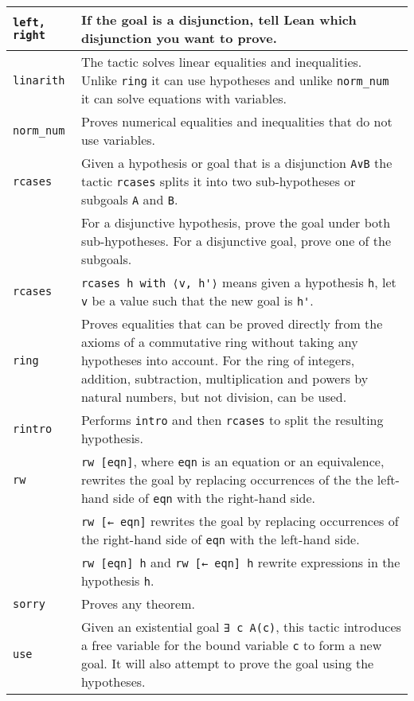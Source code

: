 \begin{tabular}{p{}|@{\hspace{1em}}p{}}
\Verb+left, right+ & If the goal is a disjunction, tell Lean which disjunction you want to prove.\\\hline

\Verb+linarith+&The tactic solves linear equalities and inequalities. Unlike \Verb+ring+ it can use hypotheses and unlike \Verb+norm_num+ it can solve equations with variables.\\\hline

\Verb+norm_num+&Proves numerical equalities and inequalities that do not use variables.\\\hline

\Verb+rcases+&Given a hypothesis or goal that is a disjunction \Verb+A∨B+ the tactic \Verb+rcases+ splits it into two sub-hypotheses or subgoals \Verb+A+ and \Verb+B+.\\
&For a disjunctive hypothesis, prove the goal under both sub-hypotheses. For a disjunctive goal, prove one of the subgoals.\\\hline

\Verb+rcases+&\Verb+rcases h with ⟨v, h'⟩+ means given a hypothesis \Verb+h+, let \Verb+v+ be a value such that the new goal is \Verb+h'+.\\\hline

\Verb+ring+&Proves equalities that can be proved directly from the axioms of a commutative ring without taking any hypotheses into account. For the ring of integers, addition, subtraction, multiplication and powers by natural numbers, but not division, can be used.\\\hline

\Verb+rintro+&Performs \Verb+intro+ and then \Verb+rcases+ to split the resulting hypothesis.\\\hline

\Verb+rw+&\Verb+rw [eqn]+, where \Verb+eqn+ is an equation or an equivalence, rewrites the goal by replacing occurrences of the the left-hand side of \Verb+eqn+ with the right-hand side.\\
&\Verb+rw [← eqn]+ rewrites the goal by replacing occurrences of the right-hand side of \Verb+eqn+ with the left-hand side.\\
&\Verb+rw [eqn] h+ and \Verb+rw [← eqn] h+ rewrite expressions in the hypothesis \Verb+h+.\\\hline

\Verb+sorry+&Proves any theorem.\\\hline

\Verb+use+&Given an existential goal \Verb+∃ c A(c)+, this tactic introduces a free variable for the bound variable \Verb+c+ to form a new goal. It will also attempt to prove the goal using the hypotheses.\\\hline


\end{tabular}
